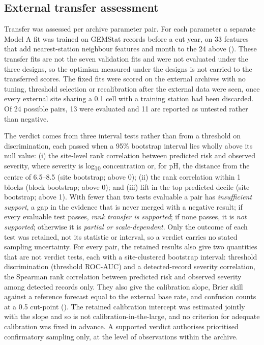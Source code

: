 \documentclass[10pt,letterpaper]{article}
\begin{document}
\subsection*{External transfer assessment}

Transfer was assessed per archive \texttimes{} parameter pair. For each parameter a separate Model A fit was trained on GEMStat records before a cut year, on 33 features that add nearest-station neighbour features and month to the 24 above (). These transfer fits are not the seven validation fits and were not evaluated under the three designs, so the optimism measured under the designs is not carried to the transferred scores. The fixed fits were scored on the external archives with no tuning, threshold selection or recalibration after the external data were seen, once every external site sharing a 0.1\textdegree{} cell with a training station had been discarded. Of 24 possible pairs, 13 were evaluated and 11 are reported as untested rather than negative.

The verdict comes from three interval tests rather than from a threshold on discrimination, each passed when a 95\% bootstrap interval lies wholly above its null value: (i) the site-level rank correlation between predicted risk and observed severity, where severity is log\textsubscript{10} concentration or, for pH, the distance from the centre of 6.5--8.5 (site bootstrap; above 0); (ii) the rank correlation within 1\textdegree{} blocks (block bootstrap; above 0); and (iii) lift in the top predicted decile (site bootstrap; above 1). With fewer than two tests evaluable a pair has \textit{insufficient support}, a gap in the evidence that is never merged with a negative result; if every evaluable test passes, \textit{rank transfer is supported}; if none passes, it is \textit{not supported}; otherwise it is \textit{partial or scale-dependent}. Only the outcome of each test was retained, not its statistic or interval, so a verdict carries no stated sampling uncertainty. For every pair, the retained results also give two quantities that are not verdict tests, each with a site-clustered bootstrap interval: threshold discrimination (threshold ROC-AUC) and a detected-record severity correlation, the Spearman rank correlation between predicted risk and observed severity among detected records only. They also give the calibration slope, Brier skill against a reference forecast equal to the external base rate, and confusion counts at a 0.5 cut-point (). The retained calibration intercept was estimated jointly with the slope and so is not calibration-in-the-large, and no criterion for adequate calibration was fixed in advance. A supported verdict authorises prioritised confirmatory sampling only, at the level of observations within the archive.
\end{document}
